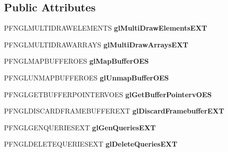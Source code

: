 \subsection*{Public Attributes}
\begin{DoxyCompactItemize}
\item 
\hypertarget{class_c_p_v_r_tgles2_ext_a3bf590db69b6b5ab77a97c769a21bc4f}{P\+F\+N\+G\+L\+M\+U\+L\+T\+I\+D\+R\+A\+W\+E\+L\+E\+M\+E\+N\+T\+S {\bfseries gl\+Multi\+Draw\+Elements\+E\+X\+T}}\label{class_c_p_v_r_tgles2_ext_a3bf590db69b6b5ab77a97c769a21bc4f}

\item 
\hypertarget{class_c_p_v_r_tgles2_ext_a8c060c88a4a4fa49486a0660b1a6b3fd}{P\+F\+N\+G\+L\+M\+U\+L\+T\+I\+D\+R\+A\+W\+A\+R\+R\+A\+Y\+S {\bfseries gl\+Multi\+Draw\+Arrays\+E\+X\+T}}\label{class_c_p_v_r_tgles2_ext_a8c060c88a4a4fa49486a0660b1a6b3fd}

\item 
\hypertarget{class_c_p_v_r_tgles2_ext_a0dfc21fd3aa41b4355534027b0f0d3d8}{P\+F\+N\+G\+L\+M\+A\+P\+B\+U\+F\+F\+E\+R\+O\+E\+S {\bfseries gl\+Map\+Buffer\+O\+E\+S}}\label{class_c_p_v_r_tgles2_ext_a0dfc21fd3aa41b4355534027b0f0d3d8}

\item 
\hypertarget{class_c_p_v_r_tgles2_ext_a2a4c48a4136064c948d347214c2283ef}{P\+F\+N\+G\+L\+U\+N\+M\+A\+P\+B\+U\+F\+F\+E\+R\+O\+E\+S {\bfseries gl\+Unmap\+Buffer\+O\+E\+S}}\label{class_c_p_v_r_tgles2_ext_a2a4c48a4136064c948d347214c2283ef}

\item 
\hypertarget{class_c_p_v_r_tgles2_ext_a113f7d23842fb535ae809af4b61f859f}{P\+F\+N\+G\+L\+G\+E\+T\+B\+U\+F\+F\+E\+R\+P\+O\+I\+N\+T\+E\+R\+V\+O\+E\+S {\bfseries gl\+Get\+Buffer\+Pointerv\+O\+E\+S}}\label{class_c_p_v_r_tgles2_ext_a113f7d23842fb535ae809af4b61f859f}

\item 
\hypertarget{class_c_p_v_r_tgles2_ext_a555ad8a16b3d6043ecab4dfcb03d9731}{P\+F\+N\+G\+L\+D\+I\+S\+C\+A\+R\+D\+F\+R\+A\+M\+E\+B\+U\+F\+F\+E\+R\+E\+X\+T {\bfseries gl\+Discard\+Framebuffer\+E\+X\+T}}\label{class_c_p_v_r_tgles2_ext_a555ad8a16b3d6043ecab4dfcb03d9731}

\item 
\hypertarget{class_c_p_v_r_tgles2_ext_aa453f812e54c17067d12a8e4d4ff9bfa}{P\+F\+N\+G\+L\+G\+E\+N\+Q\+U\+E\+R\+I\+E\+S\+E\+X\+T {\bfseries gl\+Gen\+Queries\+E\+X\+T}}\label{class_c_p_v_r_tgles2_ext_aa453f812e54c17067d12a8e4d4ff9bfa}

\item 
\hypertarget{class_c_p_v_r_tgles2_ext_a53f2ebe11ffe86e5e303924f500fdf73}{P\+F\+N\+G\+L\+D\+E\+L\+E\+T\+E\+Q\+U\+E\+R\+I\+E\+S\+E\+X\+T {\bfseries gl\+Delete\+Queries\+E\+X\+T}}\label{class_c_p_v_r_tgles2_ext_a53f2ebe11ffe86e5e303924f500fdf73}


\end{DoxyCompactItemize}
